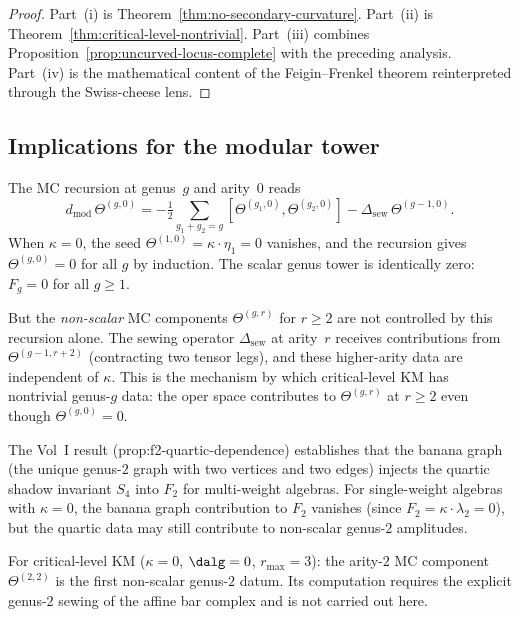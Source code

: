\documentclass[11pt]{article}
\begin{document}
\begin{proof}
Part~(i) is Theorem~\ref{thm:no-secondary-curvature}.
Part~(ii) is Theorem~\ref{thm:critical-level-nontrivial}.
Part~(iii) combines
Proposition~\ref{prop:uncurved-locus-complete}
with the preceding analysis.
Part~(iv) is the mathematical content of the Feigin--Frenkel
theorem reinterpreted through the Swiss-cheese lens.
\end{proof}

\subsection{Implications for the modular tower}

\begin{remark}[The sewing operator at $\kappa = 0$]
\label{rem:sewing-kappa-zero}
The MC recursion at genus~$g$ and arity~$0$ reads
\[
d_{\mathrm{mod}}\,\Theta^{(g,0)}
= -\tfrac{1}{2}
\sum_{g_1+g_2=g} [\Theta^{(g_1,0)}, \Theta^{(g_2,0)}]
- \Delta_{\mathrm{sew}}\,\Theta^{(g-1,0)}.
\]
When $\kappa = 0$, the seed $\Theta^{(1,0)} = \kappa \cdot \eta_1 = 0$
vanishes, and the recursion gives $\Theta^{(g,0)} = 0$ for all $g$
by induction.  The scalar genus tower is identically zero:
$F_g = 0$ for all $g \geq 1$.

But the \emph{non-scalar} MC components
$\Theta^{(g,r)}$ for $r \geq 2$ are not controlled by
this recursion alone.  The sewing operator
$\Delta_{\mathrm{sew}}$ at arity~$r$ receives contributions
from $\Theta^{(g-1,r+2)}$ (contracting two tensor legs),
and these higher-arity data are independent of $\kappa$.
This is the mechanism by which critical-level KM has
nontrivial genus-$g$ data: the oper space contributes to
$\Theta^{(g,r)}$ at $r \geq 2$ even though
$\Theta^{(g,0)} = 0$.
\end{remark}

\begin{remark}
\label{rem:banana-graph}
The Vol~I result (prop:f2-quartic-dependence) establishes that
the banana graph (the unique genus-$2$ graph with two vertices
and two edges) injects the quartic shadow invariant $S_4$
into $F_2$ for multi-weight algebras.  For single-weight
algebras with $\kappa = 0$, the banana graph contribution
to $F_2$ vanishes (since $F_2 = \kappa \cdot \lambda_2 = 0$),
but the quartic data may still contribute to non-scalar
genus-$2$ amplitudes.

For critical-level KM ($\kappa = 0$, $\dalg = 0$,
$r_{\max} = 3$): the arity-$2$ MC component
$\Theta^{(2,2)}$ is the first non-scalar genus-$2$ datum.
Its computation requires the explicit genus-$2$ sewing of
the affine bar complex and is not carried out here.
\end{remark}
\end{document}
